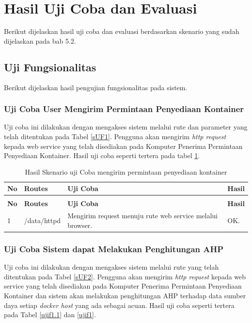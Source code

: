     \section{Hasil Uji Coba dan Evaluasi}
    	Berikut dijelaskan hasil uji coba dan evaluasi berdasarkan skenario yang sudah dijelaskan pada bab 5.2.

\subsection{Uji Fungsionalitas}
Berikut dijelaskan hasil pengujian fungsionalitas pada sistem.
\subsubsection{Uji Coba User Mengirim Permintaan Penyediaan Kontainer}
      Uji coba ini dilakukan dengan mengakses sistem melalui rute dan parameter yang telah ditentukan pada Tabel \ref{sUF1}. Pengguna akan mengirim \textit{http request} kepada web service yang telah disediakan pada Komputer Penerima Permintaan Penyediaan Kontainer. Hasil uji coba seperti tertera pada tabel \ref{HsUF1}.
      
      \begin{longtable}{|p{}|p{}|p{}|p{}|} %

\caption{Hasil Skenario Uji Coba mengirim permintaan penyediaan kontainer} \label{HsUF1} \\
\hline
\textbf{No} & \textbf{Routes} & \textbf{Uji Coba} & \textbf{Hasil} \\ \hline
\endfirsthead
\caption[]{Hasil Skenario uji Coba mengirim permintaan penyediaan kontainer}  \\
\hline
\textbf{No} & \textbf{Routes} & \textbf{Uji Coba} & \textbf{Hasil} \\ \hline
\endhead
\endfoot
\endlastfoot
1 & /data/httpd & Mengirim request menuju rute web service melalui browser. & OK. \\ \hline
\end{longtable}	

\subsubsection{Uji Coba Sistem dapat Melakukan Penghitungan AHP}
      Uji coba ini dilakukan dengan mengakses sistem melalui rute yang telah ditentukan pada Tabel \ref{sUF2}. Pengguna akan mengirim \textit{http request} kepada web service yang telah disediakan pada Komputer Penerima Permintaan Penyediaan Kontainer dan sistem akan melakukan penghitungan AHP terhadap data sumber daya setiap \textit{docker host} yang ada sebagai acuan. Hasil uji coba seperti tertera pada Tabel \ref{ujif1.1} dan \ref{ujif1}.
     

